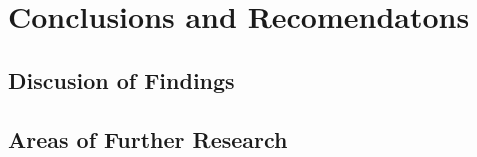 \documentclass[
]{book}
\begin{document}
\hypertarget{conclusions-and-recomendatons}{%
\chapter{Conclusions and Recomendatons}\label{conclusions-and-recomendatons}}

\hypertarget{discusion-of-findings}{%
\section{Discusion of Findings}\label{discusion-of-findings}}

\hypertarget{areas-of-further-research}{%
\section{Areas of Further Research}\label{areas-of-further-research}}

  
\end{document}
